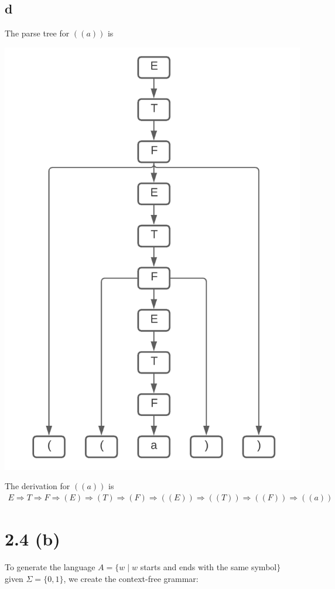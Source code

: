 \documentclass{article}
\begin{document}
\subsection*{d}
The parse tree for $((a))$ is
\begin{center}
    \includegraphics[scale=.65]{21d.png}
\end{center}
The derivation for $((a))$ is
\begin{align*}
    E \Rightarrow T \Rightarrow F \Rightarrow(E) \Rightarrow (T) \Rightarrow (F) \Rightarrow ((E)) \Rightarrow ((T)) \Rightarrow ((F)) \Rightarrow((a))
\end{align*}

\pagebreak

\section*{2.4 (b)}
    To generate the language $A = \{w \mid w$ starts and ends with the same symbol$\}$ given $\Sigma = \{0, 1\}$, we create the context-free grammar:
    
\end{document}
